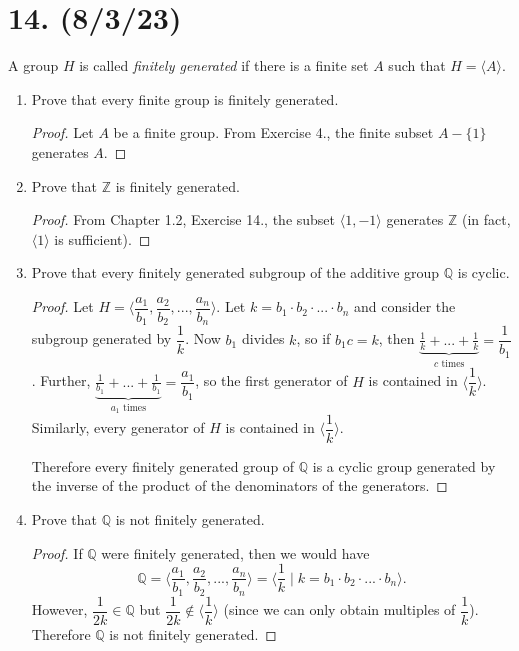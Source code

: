 \documentclass{article}
\begin{document}
\section*{14. (8/3/23)}

A group $H$ is called \emph{finitely generated} if there is a finite set $A$ such that $H = \langle A \rangle$.

\begin{enumerate}[label=(\alph*), itemsep=0em]
    \item Prove that every finite group is finitely generated.
          \begin{proof}
            Let $A$ be a finite group. From Exercise 4., the finite subset $A - \{ 1 \}$ generates $A$.
          \end{proof}
    \item Prove that $\mathbb{Z}$ is finitely generated.
          \begin{proof}
            From Chapter 1.2, Exercise 14., the subset $\langle 1, -1 \rangle$ generates $\mathbb{Z}$ (in fact, $\langle 1 \rangle$ is sufficient).
          \end{proof}
    \item Prove that every finitely generated subgroup of the additive group $\mathbb{Q}$ is cyclic.
          \begin{proof}
            Let $H = \langle \dfrac{a_1}{b_1}, \dfrac{a_2}{b_2}, ..., \dfrac{a_n}{b_n} \rangle$. Let $k = b_1 \cdot b_2 \cdot ... \cdot b_n$ and consider the subgroup generated by $\dfrac{1}{k}$. Now $b_1$ divides $k$, so if $b_1 c = k$, then $\underbrace{\frac{1}{k} + ... + \frac{1}{k}}_{\text{$c$ times}} = \dfrac{1}{b_1}$. Further, $\underbrace{\frac{1}{b_1} + ... + \frac{1}{b_1}}_{\text{$a_1$ times}} = \dfrac{a_1}{b_1}$, so the first generator of $H$ is contained in $\langle \dfrac{1}{k} \rangle$. Similarly, every generator of $H$ is contained in $\langle \dfrac{1}{k} \rangle$.

            Therefore every finitely generated group of $\mathbb{Q}$ is a cyclic group generated by the inverse of the product of the denominators of the generators.
          \end{proof}
    \item Prove that $\mathbb{Q}$ is not finitely generated.
          \begin{proof}
            If $\mathbb{Q}$ were finitely generated, then we would have
            \begin{equation*}
                \mathbb{Q} = \langle \frac{a_1}{b_1}, \frac{a_2}{b_2}, ..., \frac{a_n}{b_n} \rangle = \langle \frac{1}{k} \mid k = b_1 \cdot b_2 \cdot ... \cdot b_n \rangle.
            \end{equation*} 
            However, $\dfrac{1}{2k} \in \mathbb{Q}$ but $\dfrac{1}{2k} \notin \langle \dfrac{1}{k} \rangle$ (since we can only obtain multiples of $\dfrac{1}{k}$). Therefore $\mathbb{Q}$ is not finitely generated.
          \end{proof}
\end{enumerate}
\end{document}

